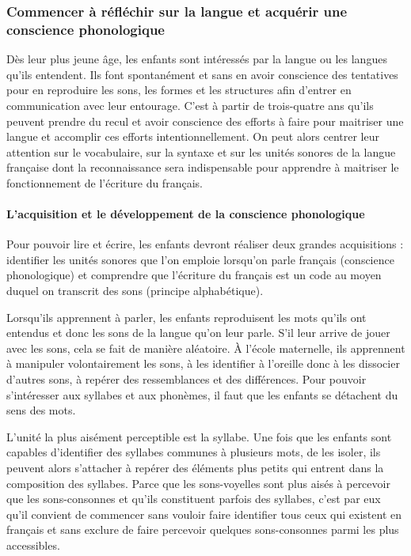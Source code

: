 \subsubsection{Commencer à réfléchir sur la langue et acquérir une conscience phonologique}
Dès leur plus jeune âge, les enfants sont intéressés par la langue ou les langues qu’ils entendent. Ils font spontanément et sans en avoir conscience des tentatives pour en reproduire les sons, les formes et les structures afin d’entrer en communication avec leur entourage. C’est à partir de trois-quatre ans qu’ils peuvent prendre du recul et avoir conscience des efforts à faire pour maitriser une langue et accomplir ces efforts intentionnellement. On peut alors centrer leur attention sur le vocabulaire, sur la syntaxe et sur les unités sonores de la langue française dont la reconnaissance sera indispensable pour apprendre à maitriser le fonctionnement de l’écriture du français.

\paragraph{L’acquisition et le développement de la conscience phonologique}
Pour pouvoir lire et écrire, les enfants devront réaliser deux grandes acquisitions : identifier les unités sonores que l’on emploie lorsqu’on parle français (conscience phonologique) et comprendre que l’écriture du français est un code au moyen duquel on transcrit des sons (principe alphabétique).

Lorsqu’ils apprennent à parler, les enfants reproduisent les mots qu’ils ont entendus et donc les sons de la langue qu’on leur parle. S’il leur arrive de jouer avec les sons, cela se fait de manière aléatoire. À l’école maternelle, ils apprennent à manipuler volontairement les sons, à les identifier à l’oreille donc à les dissocier d’autres sons, à repérer des ressemblances et des différences. Pour pouvoir s’intéresser aux syllabes et aux phonèmes, il faut que les enfants se détachent du sens des mots. 

L’unité la plus aisément perceptible est la syllabe. Une fois que les enfants sont capables d’identifier des syllabes communes à plusieurs mots, de les isoler, ils peuvent alors s’attacher à repérer des éléments plus petits qui entrent dans la composition des syllabes. Parce que les sons-voyelles sont plus aisés à percevoir que les sons-consonnes et qu’ils constituent parfois des syllabes, c’est par eux qu’il convient de commencer sans vouloir faire identifier tous ceux qui existent en français et sans exclure de faire percevoir quelques sons-consonnes parmi les plus accessibles. 


